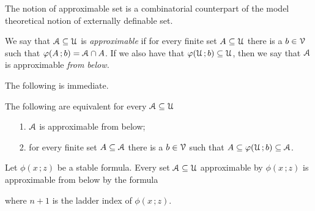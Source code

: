 \documentclass[scombinatorics.tex]{subfiles}
\begin{document}
The notion of approximable set is a combinatorial counterpart of the model theoretical notion of externally definable set.

\begin{definition}\label{def_approx}
  We say that $\EuScript A\subseteq\EuScript U$ is \emph{approximable\/} if for every finite set $A\subseteq\EuScript U$ there is a $b\in\EuScript V$ such that $\varphi(A\,;b)=\EuScript A\cap A$.
  If we also have that $\varphi(\EuScript U\,;b)\subseteq\EuScript U$, then we say that $\EuScript A$ is approximable \emph{from below.}
\end{definition}

The following is immediate.

\begin{fact}
  The following are equivalent for every $\EuScript A\subseteq\EuScript U$
  \begin{itemize}
    \item[1.] $\EuScript A$ is approximable from below;
    \item[2.] for every finite set $A\subseteq\EuScript A$ there is a $b\in\EuScript V$ such that $A\subseteq\varphi(\EuScript U\,;b)\subseteq\EuScript A$.\QED
  \end{itemize}
\end{fact}

\begin{proposition}
  Let $\phi(x\,;z)$ be a stable formula.
  Every set $\EuScript A\subseteq\EuScript U$ approximable by $\phi(x\,;z)$ is approximable from below by the formula

  
  where $n+1$ is the ladder index of $\phi(x\,;z)$.
\end{proposition}
\end{document}
